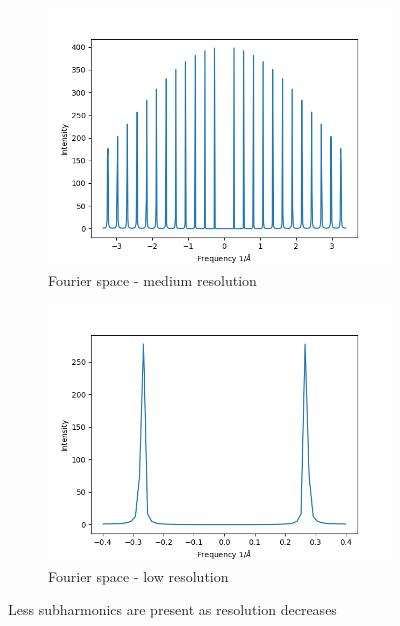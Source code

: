 \documentclass{article}
\begin{document}
\begin{figure}
\begin{subfigure}{0.33\textwidth}
        \end{subfigure}
        \begin{subfigure}{0.33\textwidth}
                \centering
                \includegraphics[width=\textwidth]{fourier_delta_1d_medres}
                \caption{Fourier space - medium resolution}\label{fourier_delta_1d_medres}
        \end{subfigure}
        \begin{subfigure}{0.33\textwidth}
                \centering
                \includegraphics[width=\textwidth]{fourier_delta_1d_lowres}
                \caption{Fourier space - low resolution}\label{fourier_delta_1d_lowres}
        \end{subfigure}
	\caption{Less subharmonics are present as resolution decreases}\label{fig:1D_deltas}
\end{figure}
\end{document}
